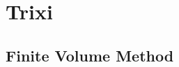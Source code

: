\documentclass[../main.tex]{subfiles}
\begin{document}
\chapter{Trixi}
\label{chap:TRIXI}

\section{Finite Volume Method}
\label{sec:FVM}
\end{document}
